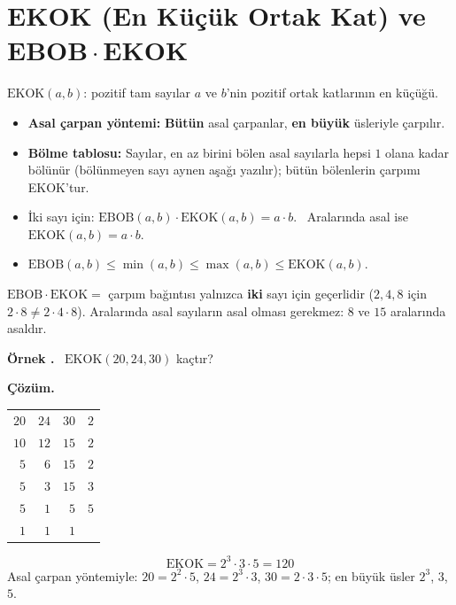 \documentclass[11pt,a4paper]{article}
\newcounter{ornek}
\newenvironment{ornek}{\needspace{5\baselineskip}\refstepcounter{ornek}\par\medskip\noindent\textbf{\color{anamavi}Örnek \theornek.}\ }{\par}
\newenvironment{cozumk}{\begin{tcolorbox}[colback=cozumyesil!6,colframe=cozumyesil,boxrule=0.5pt,left=4pt,right=4pt,top=2pt,bottom=2pt]\textbf{\color{cozumyesil}Çözüm.}\ }{\end{tcolorbox}}
\begin{document}
\section{EKOK (En Küçük Ortak Kat) ve EBOB\,\(\cdot\)\,EKOK}

\begin{kural}
\(\text{EKOK}(a,b)\): pozitif tam sayılar \(a\) ve \(b\)'nin pozitif ortak katlarının en küçüğü.
\begin{itemize}[leftmargin=*,itemsep=1pt]
\item \textbf{Asal çarpan yöntemi:} \textbf{Bütün} asal çarpanlar, \textbf{en büyük} üsleriyle çarpılır.
\item \textbf{Bölme tablosu:} Sayılar, en az birini bölen asal sayılarla hepsi \(1\) olana kadar bölünür (bölünmeyen sayı aynen aşağı yazılır); bütün bölenlerin çarpımı EKOK'tur.
\item İki sayı için: \(\text{EBOB}(a,b)\cdot\text{EKOK}(a,b)=a\cdot b\). \ Aralarında asal ise \(\text{EKOK}(a,b)=a\cdot b\).
\item \(\text{EBOB}(a,b)\le\min(a,b)\le\max(a,b)\le\text{EKOK}(a,b)\).
\end{itemize}
\end{kural}

\begin{dikkat}
\(\text{EBOB}\cdot\text{EKOK}=\) çarpım bağıntısı yalnızca \textbf{iki} sayı için geçerlidir (\(2,4,8\) için \(2\cdot 8\neq 2\cdot 4\cdot 8\)). Aralarında asal sayıların asal olması gerekmez: \(8\) ve \(15\) aralarında asaldır.
\end{dikkat}

\begin{ornek}
\(\text{EKOK}(20,24,30)\) kaçtır?
\end{ornek}
\begin{cozumk}\par
\begin{minipage}[t]{0.40\linewidth}
\begin{tabular}{rrr|l}
\(20\) & \(24\) & \(30\) & \(2\)\\
\(10\) & \(12\) & \(15\) & \(2\)\\
\(5\) & \(6\) & \(15\) & \(2\)\\
\(5\) & \(3\) & \(15\) & \(3\)\\
\(5\) & \(1\) & \(5\) & \(5\)\\
\(1\) & \(1\) & \(1\) &
\end{tabular}
\end{minipage}\hfill
\begin{minipage}[t]{0.56\linewidth}
\[\text{EKOK}=2^3\cdot 3\cdot 5=120\]
Asal çarpan yöntemiyle: \(20=2^2\cdot 5\), \(24=2^3\cdot 3\), \(30=2\cdot 3\cdot 5\); en büyük üsler \(2^3\), \(3\), \(5\).
\end{minipage}
\end{cozumk}
\end{document}
